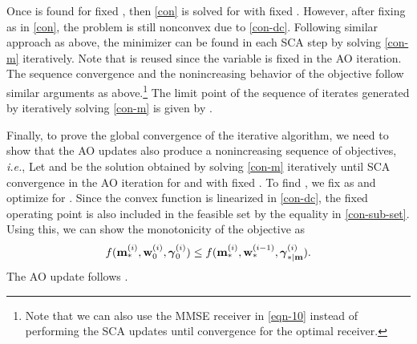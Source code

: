 
Once  is found for fixed \me{\my}, then \eqref{con} is solved for \me{\my} with fixed \me{\mx}. However, after fixing \me{\mx} as  in \eqref{con}, the problem is still nonconvex due to \eqref{con-dc}. Following similar approach as above, the minimizer  can be found in each \ac{SCA} step  by solving \eqref{con-m} iteratively. Note that  is reused since the variable \me{\mx} is fixed in the  \ac{AO} iteration. The sequence convergence and the nonincreasing behavior of the objective follow similar arguments as above.\footnote{Note that we can also use the \ac{MMSE} receiver in \eqref{eqn-10} instead of performing the \ac{SCA} updates until convergence for the optimal receiver.} The limit point of the sequence of iterates generated by iteratively solving \eqref{con-m} is given by . 

Finally, to prove the global convergence of the iterative algorithm, we need to show that the \ac{AO} updates also produce a nonincreasing sequence of objectives, \textit{i.e.}, 
\iftoggle{single_column}{
\begin{equation}
f(\iter{\mx}{\ast}{i},\iter{\my}{0}{i},\iter{\mz}{0}{i}) \leq f(\iter{\mx}{\ast}{i},\iter{\my}{\ast}{i-1},\iter{\mz}{\ast|\my}{i}).
\end{equation}}{
\begin{equation}
f(\iter{\mx}{\ast}{i},\iter{\my}{0}{i},\iter{\mz}{0}{i}) \leq f(\iter{\mx}{\ast}{i},\iter{\my}{\ast}{i-1},\iter{\mz}{\ast|\my}{i}).
\end{equation}}
Let  and  be the solution obtained by solving \eqref{con-m} iteratively until \ac{SCA} convergence in the  \ac{AO} iteration for \eqn{\mx} and \eqn{\mz} with fixed . To find , we fix \eqn{\mx} as  and optimize for \me{\my}. Since the convex function is linearized in \eqref{con-dc}, the fixed operating point is also included in the feasible set  by the equality in \eqref{con-sub-set}. Using this, we can show the monotonicity of the objective as
\begin{equation} \label{fixed_point}
f(\iter{\mx}{\ast}{i},\iter{\my}{0}{i},\iter{\mz}{0}{i}) \leq f(\iter{\mx}{\ast}{i},\iter{\my}{\ast}{i-1},\iter{\mz}{\ast|\mx}{i}).
\end{equation}
The \ac{AO} update follows .

